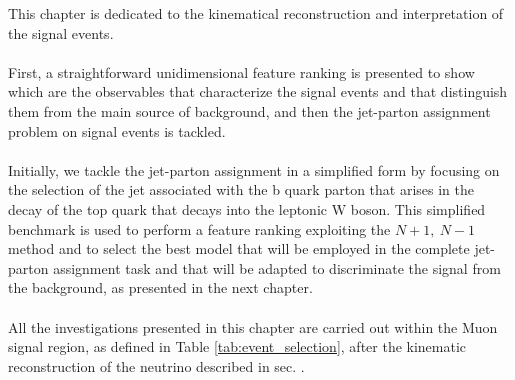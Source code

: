 \label{sec:kin}
\vspace{-1cm}
\minitoc
\vspace{0.5cm}
This chapter is dedicated to the kinematical reconstruction and interpretation of the signal events.
\\
\\
First, a straightforward unidimensional feature ranking is presented to show which are the observables that characterize the signal events and that distinguish them from the main source of background, and then the jet-parton assignment problem on signal events is tackled.
\\
\\
Initially, we tackle the jet-parton assignment in a simplified form by focusing on the selection of the jet associated with the b quark parton that arises in the decay of the top quark that decays into the leptonic W boson. This simplified benchmark is used to perform a feature ranking exploiting the $N+1,\: N-1$ method and to select the best model that will be employed in the complete jet-parton assignment task and that will be adapted to discriminate the signal from the background, as presented in the next chapter.
\\
\\
All the investigations presented in this chapter are carried out within the Muon signal region, as defined in Table \ref{tab:event_selection}, after the kinematic reconstruction of the neutrino described in sec. \ADDREF.\\

